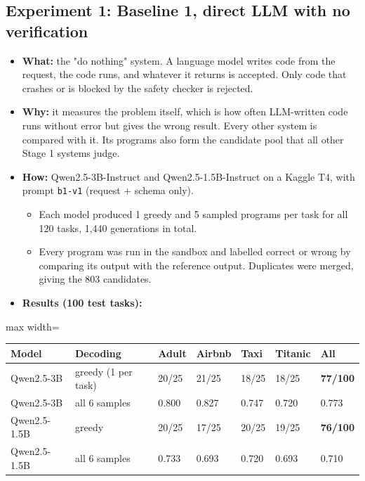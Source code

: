\documentclass[11pt]{article}
\providecommand{\tightlist}{\setlength{\itemsep}{0pt}\setlength{\parskip}{0pt}}
\begin{document}
\subsection{Experiment 1: Baseline 1, direct LLM with no verification}

\begin{itemize}
\tightlist
\item
  \textbf{What:} the "do nothing" system. A language model writes code
  from the request, the code runs, and whatever it returns is accepted.
  Only code that crashes or is blocked by the safety checker is
  rejected.
\item
  \textbf{Why:} it measures the problem itself, which is how often
  LLM-written code runs without error but gives the wrong result. Every
  other system is compared with it. Its programs also form the candidate
  pool that all other Stage 1 systems judge.
\item
  \textbf{How:} Qwen2.5-3B-Instruct and Qwen2.5-1.5B-Instruct on a
  Kaggle T4, with prompt \texttt{b1-v1} (request + schema only).

  \begin{itemize}
  \tightlist
  \item
    Each model produced 1 greedy and 5 sampled programs per task for all
    120 tasks, 1,440 generations in total.
  \item
    Every program was run in the sandbox and labelled correct or wrong
    by comparing its output with the reference output. Duplicates were
    merged, giving the 803 candidates.
  \end{itemize}
\item
  \textbf{Results (100 test tasks):}
\end{itemize}

\begin{table}[!tp]
\centering\footnotesize\setlength{\tabcolsep}{3pt}\renewcommand{\arraystretch}{1.1}
\begin{adjustbox}{max width=\textwidth}\begin{tabular}{lllllll}
\toprule
\textbf{Model} & \textbf{Decoding} & \textbf{Adult} & \textbf{Airbnb} & \textbf{Taxi} & \textbf{Titanic} & \textbf{All} \\
\midrule
Qwen2.5-3B & greedy (1 per task) & 20/25 & 21/25 & 18/25 & 18/25 & \textbf{77/100} \\
Qwen2.5-3B & all 6 samples & 0.800 & 0.827 & 0.747 & 0.720 & 0.773 \\
Qwen2.5-1.5B & greedy & 20/25 & 17/25 & 20/25 & 19/25 & \textbf{76/100} \\
Qwen2.5-1.5B & all 6 samples & 0.733 & 0.693 & 0.720 & 0.693 & 0.710 \\
\bottomrule
\end{tabular}\end{adjustbox}
\end{table}
\end{document}
